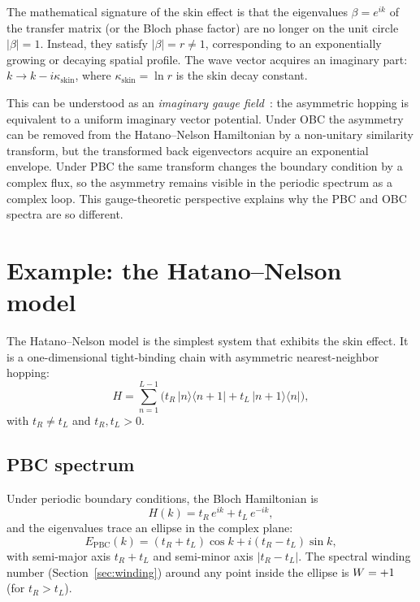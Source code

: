 The mathematical signature of the skin effect is that the eigenvalues
$\beta = e^{ik}$ of the transfer matrix (or the Bloch phase factor) are
no longer on the unit circle $|\beta| = 1$. Instead, they satisfy
$|\beta| = r \neq 1$, corresponding to an exponentially growing or
decaying spatial profile. The wave vector acquires an imaginary part:
$k \to k - i\kappa_{\mathrm{skin}}$, where
$\kappa_{\mathrm{skin}} = \ln r$ is the skin decay constant.

This can be understood as an \emph{imaginary gauge field}~\cite{longhi2019probing,zhang2021observation,yang2020non,yang2026non}: the
asymmetric hopping is equivalent to a uniform imaginary vector
potential. Under OBC the asymmetry can be removed from the Hatano--Nelson
Hamiltonian by a non-unitary similarity transform, but the transformed
back eigenvectors acquire an exponential envelope. Under PBC the same
transform changes the boundary condition by a complex flux, so the
asymmetry remains visible in the periodic spectrum as a complex loop.
This gauge-theoretic perspective explains why the PBC and OBC spectra
are so different.


\section{Example: the Hatano--Nelson model}
\label{sec:hatano-nelson}

The Hatano--Nelson model is the simplest system that exhibits the skin
effect. It is a one-dimensional tight-binding chain with asymmetric
nearest-neighbor hopping:
\begin{equation}
 H = \sum_{n=1}^{L-1}\bigl(t_R\,|n\rangle\langle n+1|
 + t_L\,|n+1\rangle\langle n|\bigr),
 \label{eq:hn-hamiltonian}
\end{equation}
with $t_R \neq t_L$ and $t_R, t_L > 0$.

\subsection{PBC spectrum}
\label{ssec:hn-pbc}

Under periodic boundary conditions, the Bloch Hamiltonian is
\begin{equation}
 H(k) = t_R\,e^{ik} + t_L\,e^{-ik},
 \label{eq:hn-bloch}
\end{equation}
and the eigenvalues trace an ellipse in the complex plane:
\begin{equation}
 E_{\mathrm{PBC}}(k) = (t_R + t_L)\cos k + i(t_R - t_L)\sin k,
 \label{eq:hn-pbc-spectrum}
\end{equation}
with semi-major axis $t_R + t_L$ and semi-minor axis $|t_R - t_L|$. The
spectral winding number (Section~\ref{sec:winding}) around any point
inside the ellipse is $W = +1$ (for $t_R > t_L$).

